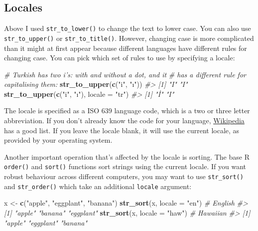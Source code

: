 \documentclass[]{book}
\newenvironment{Shaded}{\begin{snugshade}}{\end{snugshade}}
\newcommand{\CommentTok}[1]{\textcolor[rgb]{0.56,0.35,0.01}{\textit{#1}}}
\newcommand{\DataTypeTok}[1]{\textcolor[rgb]{0.13,0.29,0.53}{#1}}
\newcommand{\KeywordTok}[1]{\textcolor[rgb]{0.13,0.29,0.53}{\textbf{#1}}}
\newcommand{\NormalTok}[1]{#1}
\newcommand{\StringTok}[1]{\textcolor[rgb]{0.31,0.60,0.02}{#1}}
\begin{document}
\hypertarget{locales}{%
\subsection{Locales}\label{locales}}

Above I used \texttt{str\_to\_lower()} to change the text to lower case. You can also use \texttt{str\_to\_upper()} or \texttt{str\_to\_title()}. However, changing case is more complicated than it might at first appear because different languages have different rules for changing case. You can pick which set of rules to use by specifying a locale:

\begin{Shaded}
\begin{Highlighting}[]
\CommentTok{# Turkish has two i's: with and without a dot, and it}
\CommentTok{# has a different rule for capitalising them:}
\KeywordTok{str_to_upper}\NormalTok{(}\KeywordTok{c}\NormalTok{(}\StringTok{"i"}\NormalTok{, }\StringTok{"ı"}\NormalTok{))}
\CommentTok{#> [1] "I" "I"}
\KeywordTok{str_to_upper}\NormalTok{(}\KeywordTok{c}\NormalTok{(}\StringTok{"i"}\NormalTok{, }\StringTok{"ı"}\NormalTok{), }\DataTypeTok{locale =} \StringTok{"tr"}\NormalTok{)}
\CommentTok{#> [1] "İ" "I"}
\end{Highlighting}
\end{Shaded}

The locale is specified as a ISO 639 language code, which is a two or three letter abbreviation. If you don't already know the code for your language, \href{https://en.wikipedia.org/wiki/List_of_ISO_639-1_codes}{Wikipedia} has a good list. If you leave the locale blank, it will use the current locale, as provided by your operating system.

Another important operation that's affected by the locale is sorting. The base R \texttt{order()} and \texttt{sort()} functions sort strings using the current locale. If you want robust behaviour across different computers, you may want to use \texttt{str\_sort()} and \texttt{str\_order()} which take an additional \texttt{locale} argument:

\begin{Shaded}
\begin{Highlighting}[]
\NormalTok{x <-}\StringTok{ }\KeywordTok{c}\NormalTok{(}\StringTok{"apple"}\NormalTok{, }\StringTok{"eggplant"}\NormalTok{, }\StringTok{"banana"}\NormalTok{)}
\KeywordTok{str_sort}\NormalTok{(x, }\DataTypeTok{locale =} \StringTok{"en"}\NormalTok{)  }\CommentTok{# English}
\CommentTok{#> [1] "apple"    "banana"   "eggplant"}
\KeywordTok{str_sort}\NormalTok{(x, }\DataTypeTok{locale =} \StringTok{"haw"}\NormalTok{) }\CommentTok{# Hawaiian}
\CommentTok{#> [1] "apple"    "eggplant" "banana"}
\end{Highlighting}
\end{Shaded}
\end{document}
